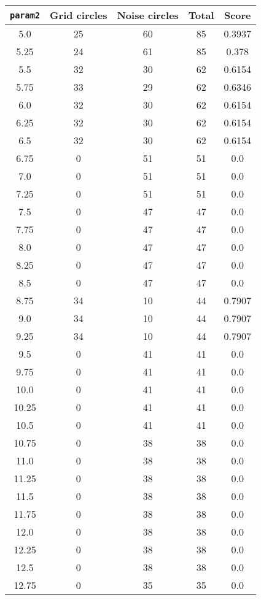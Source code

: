\documentclass[letterpaper, 12pt]{article}
\begin{document}
\begin{longtable}{|c|c|c|c|c|}
\hline
\textbf{\texttt{param2}} & \textbf{Grid circles} & \textbf{Noise circles} & \textbf{Total} & \textbf{Score} \\
\hline
5.0 & 25 & 60 & 85 & 0.3937 \\
\hline
5.25 & 24 & 61 & 85 & 0.378 \\
\hline
5.5 & 32 & 30 & 62 & 0.6154 \\
\hline
5.75 & 33 & 29 & 62 & 0.6346 \\
\hline
6.0 & 32 & 30 & 62 & 0.6154 \\
\hline
6.25 & 32 & 30 & 62 & 0.6154 \\
\hline
6.5 & 32 & 30 & 62 & 0.6154 \\
\hline
6.75 & 0 & 51 & 51 & 0.0 \\
\hline
7.0 & 0 & 51 & 51 & 0.0 \\
\hline
7.25 & 0 & 51 & 51 & 0.0 \\
\hline
7.5 & 0 & 47 & 47 & 0.0 \\
\hline
7.75 & 0 & 47 & 47 & 0.0 \\
\hline
8.0 & 0 & 47 & 47 & 0.0 \\
\hline
8.25 & 0 & 47 & 47 & 0.0 \\
\hline
8.5 & 0 & 47 & 47 & 0.0 \\
\hline
8.75 & 34 & 10 & 44 & 0.7907 \\
\hline
9.0 & 34 & 10 & 44 & 0.7907 \\
\hline
9.25 & 34 & 10 & 44 & 0.7907 \\
\hline
9.5 & 0 & 41 & 41 & 0.0 \\
\hline
9.75 & 0 & 41 & 41 & 0.0 \\
\hline
10.0 & 0 & 41 & 41 & 0.0 \\
\hline
10.25 & 0 & 41 & 41 & 0.0 \\
\hline
10.5 & 0 & 41 & 41 & 0.0 \\
\hline
10.75 & 0 & 38 & 38 & 0.0 \\
\hline
11.0 & 0 & 38 & 38 & 0.0 \\
\hline
11.25 & 0 & 38 & 38 & 0.0 \\
\hline
11.5 & 0 & 38 & 38 & 0.0 \\
\hline
11.75 & 0 & 38 & 38 & 0.0 \\
\hline
12.0 & 0 & 38 & 38 & 0.0 \\
\hline
12.25 & 0 & 38 & 38 & 0.0 \\
\hline
12.5 & 0 & 38 & 38 & 0.0 \\
\hline
12.75 & 0 & 35 & 35 & 0.0 \\

\end{longtable}
\end{document}
